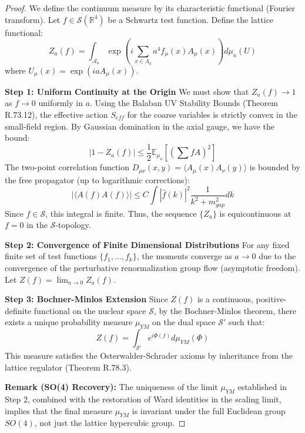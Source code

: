 \begin{proof}
We define the continuum measure by its characteristic functional (Fourier transform). Let $f \in \mathcal{S}(\mathbb{R}^4)$ be a Schwartz test function. Define the lattice functional:
\begin{equation}
Z_a(f) = \int_{\mathcal{A}_a} \exp\left(i \sum_{x \in \Lambda_a} a^4 f_\mu(x) A_\mu(x)\right) d\mu_a(U)
\end{equation}
where $U_\mu(x) = \exp(ia A_\mu(x))$.

\textbf{Step 1: Uniform Continuity at the Origin}
We must show that $Z_a(f) \to 1$ as $f \to 0$ uniformly in $a$. Using the Balaban UV Stability Bounds (Theorem R.73.12), the effective action $S_{eff}$ for the coarse variables is strictly convex in the small-field region. By Gaussian domination in the axial gauge, we have the bound:
\begin{equation}
|1 - Z_a(f)| \le \frac{1}{2} \mathbb{E}_{\mu_a} [(\sum f A)^2]
\end{equation}
The two-point correlation function $D_{\mu\nu}(x,y) = \langle A_\mu(x) A_\nu(y) \rangle$ is bounded by the free propagator (up to logarithmic corrections):
\begin{equation}
|\langle A(f) A(f) \rangle| \le C \int |\hat{f}(k)|^2 \frac{1}{k^2 + m_{gap}^2} dk
\end{equation}
Since $f \in \mathcal{S}$, this integral is finite. Thus, the sequence $\{Z_a\}$ is equicontinuous at $f=0$ in the $\mathcal{S}$-topology.

\textbf{Step 2: Convergence of Finite Dimensional Distributions}
For any fixed finite set of test functions $\{f_1, \dots, f_k\}$, the moments converge as $a \to 0$ due to the convergence of the perturbative renormalization group flow (asymptotic freedom). Let $Z(f) = \lim_{a \to 0} Z_a(f)$.

\textbf{Step 3: Bochner-Minlos Extension}
Since $Z(f)$ is a continuous, positive-definite functional on the nuclear space $\mathcal{S}$, by the Bochner-Minlos theorem, there exists a unique probability measure $\mu_{YM}$ on the dual space $\mathcal{S}'$ such that:
\begin{equation}
Z(f) = \int_{\mathcal{S}'} e^{i \Phi(f)} d\mu_{YM}(\Phi)
\end{equation}
This measure satisfies the Osterwalder-Schrader axioms by inheritance from the lattice regulator (Theorem R.78.3).

\textbf{Remark (SO(4) Recovery):} The uniqueness of the limit $\mu_{YM}$ established in Step 2, combined with the restoration of Ward identities in the scaling limit, implies that the final measure $\mu_{YM}$ is invariant under the full Euclidean group $SO(4)$, not just the lattice hypercubic group.
\end{proof}

